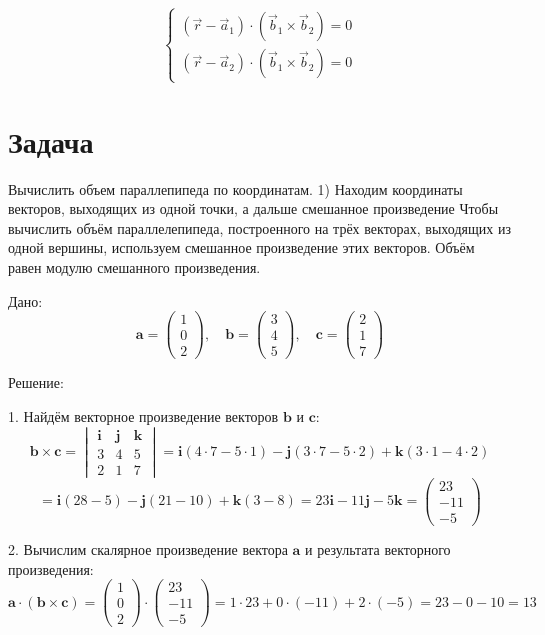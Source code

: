 \documentclass[a4paper,14pt]{extreport} %
\begin{document}
\[
\boxed{
\begin{cases}
(\vec{r} - \vec{a}_1) \cdot (\vec{b}_1 \times \vec{b}_2) = 0 \\
(\vec{r} - \vec{a}_2) \cdot (\vec{b}_1 \times \vec{b}_2) = 0
\end{cases}
}
\]
\section*{Задача}
Вычислить объем параллепипеда по координатам. 
1) Находим координаты векторов, выходящих из одной точки, а дальше смешанное произведение 
Чтобы вычислить объём параллелепипеда, построенного на трёх векторах, выходящих из одной вершины, используем смешанное произведение этих векторов. Объём равен модулю смешанного произведения.

 Дано: 
\[
\mathbf{a} = \begin{pmatrix}1 \\ 0 \\ 2\end{pmatrix}, \quad
\mathbf{b} = \begin{pmatrix}3 \\ 4 \\ 5\end{pmatrix}, \quad
\mathbf{c} = \begin{pmatrix}2 \\ 1 \\ 7\end{pmatrix}
\]

 Решение: 

1.  Найдём векторное произведение векторов \(\mathbf{b}\) и \(\mathbf{c}\): 
\[
\mathbf{b} \times \mathbf{c} = \begin{vmatrix}
\mathbf{i} & \mathbf{j} & \mathbf{k} \\
3 & 4 & 5 \\
2 & 1 & 7
\end{vmatrix}
= \mathbf{i}(4 \cdot 7 - 5 \cdot 1) - \mathbf{j}(3 \cdot 7 - 5 \cdot 2) + \mathbf{k}(3 \cdot 1 - 4 \cdot 2)
\]
\[
= \mathbf{i}(28 - 5) - \mathbf{j}(21 - 10) + \mathbf{k}(3 - 8) = 23\mathbf{i} - 11\mathbf{j} - 5\mathbf{k} = \begin{pmatrix}23 \\ -11 \\ -5\end{pmatrix}
\]

2.  Вычислим скалярное произведение вектора \(\mathbf{a}\) и результата векторного произведения: 
\[
\mathbf{a} \cdot (\mathbf{b} \times \mathbf{c}) = \begin{pmatrix}1 \\ 0 \\ 2\end{pmatrix} \cdot \begin{pmatrix}23 \\ -11 \\ -5\end{pmatrix} = 1 \cdot 23 + 0 \cdot (-11) + 2 \cdot (-5) = 23 - 0 - 10 = 13
\]
\end{document}
